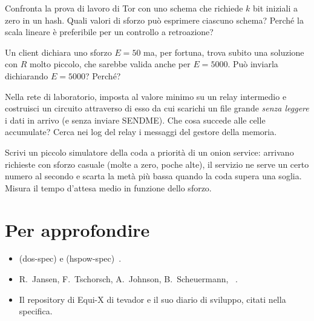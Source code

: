 \begin{esercizio}[2]\label{es:15-bit}
Confronta la prova di lavoro di Tor con uno schema che richiede $k$ bit iniziali a zero in un hash. Quali valori di sforzo può esprimere ciascuno schema? Perché la scala lineare è preferibile per un controllo a retroazione?
\end{esercizio}

\begin{esercizio}[2]\label{es:15-sforzo}
Un client dichiara uno sforzo $E = 50$ ma, per fortuna, trova subito una soluzione con $R$ molto piccolo, che sarebbe valida anche per $E = 5000$. Può inviarla dichiarando $E = 5000$? Perché?
\end{esercizio}

\begin{esercizio}[3]\label{es:15-oom}
Nella rete di laboratorio, imposta  al valore minimo su un relay intermedio e costruisci un circuito attraverso di esso da cui scarichi un file grande \emph{senza leggere} i dati in arrivo (e senza inviare SENDME). Che cosa succede alle celle accumulate? Cerca nei log del relay i messaggi del gestore della memoria.
\end{esercizio}

\begin{esercizio}[3]\label{es:15-coda}
Scrivi un piccolo simulatore della coda a priorità di un onion service: arrivano richieste con sforzo casuale (molte a zero, poche alte), il servizio ne serve un certo numero al secondo e scarta la metà più bassa quando la coda supera una soglia. Misura il tempo d'attesa medio in funzione dello sforzo.
\end{esercizio}

\section*{Per approfondire}
\begin{itemize}
  \item {} (dos-spec) e  (hspow-spec)~\cite{torspec}.
  \item R.~Jansen, F.~Tschorsch, A.~Johnson, B.~Scheuermann, ~\cite{jansen2014sniper}.
  \item Il repository di Equi-X di tevador e il suo diario di sviluppo, citati nella specifica.
\end{itemize}
